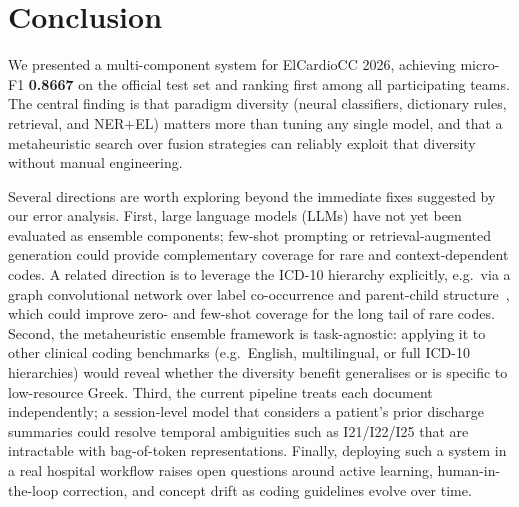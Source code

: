 \section{Conclusion}
\label{sec:conclusion}

We presented a multi-component system for ElCardioCC 2026, achieving micro-F1
\textbf{0.8667} on the official test set and ranking first among all participating teams. The central finding is that paradigm
diversity (neural classifiers, dictionary rules, retrieval, and NER+EL) matters more
than tuning any single model, and that a metaheuristic search over fusion strategies can
reliably exploit that diversity without manual engineering.

Several directions are worth exploring beyond the immediate fixes suggested by our error
analysis. First, large language models (LLMs) have not yet been evaluated as ensemble
components; few-shot prompting or retrieval-augmented generation could provide
complementary coverage for rare and context-dependent codes. A related direction is to
leverage the ICD-10 hierarchy explicitly, e.g.\ via a graph convolutional network over
label co-occurrence and parent-child structure~\cite{rios2018fewshot}, which could improve
zero- and few-shot coverage for the long tail of rare codes. Second, the metaheuristic
ensemble framework is task-agnostic: applying it to other clinical coding benchmarks
(e.g.\ English, multilingual, or full ICD-10 hierarchies) would reveal whether the
diversity benefit generalises or is specific to low-resource Greek. Third, the current
pipeline treats each document independently; a session-level model that considers a
patient's prior discharge summaries could resolve temporal ambiguities such as
I21/I22/I25 that are intractable with bag-of-token representations. Finally, deploying
such a system in a real hospital workflow raises open questions around active learning,
human-in-the-loop correction, and concept drift as coding guidelines evolve over time.
